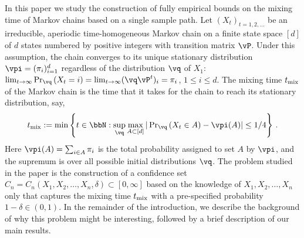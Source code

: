 

In this paper we study the construction of fully empirical bounds on the mixing time of Markov chains based on a single sample path.
Let $(X_t)_{t=1,2,\dotsc}$ be an irreducible, aperiodic time-homogeneous Markov chain on a finite state space $[d]$ of $d$ states numbered by positive integers with transition matrix $\vP$. Under this assumption, the chain converges to its unique stationary 
distribution $\vpi = (\pi_i)_{i=1}^d$ regardless of the distribution $\vq$ of $X_1$: 
$\lim_{t\to\infty} \Pr_{\vq}\Parens{X_t = i} = \lim_{t\to\infty} (\vq \vP^t)_i = \pi_i$, $1\le i \le d$.
The mixing time $t_{\operatorname{mix}}$ of the Markov chain is the time that it takes for the chain to reach its stationary distribution, say,
\[
  \tmix
  :=
  \min\Braces{
    t \in \bbN :
    \sup_{\vq}
    \max_{A\subset [d]} |\textstyle\Pr_{\vq}\Parens{ X_t \in A } - \vpi(A)|
    \leq 1/4
  }\,.
\]
Here $\vpi(A) = \sum_{i\in A} \pi_i$ is the total probability assigned
to set $A$ by $\vpi$, and the supremum is over
all possible initial distributions $\vq$.
The problem studied in the paper is the construction of a confidence
set $C_n = C_n(X_1,X_2,\dotsc,X_n,\delta) \subset [0,\infty]$ based on
the knowledge of $X_1,X_2,\dotsc,X_n$ only that captures the mixing
time $t_{\operatorname{mix}}$ with a pre-specified probability $1-\delta \in (0,1)$. 
In the remainder of the introduction, we describe the background of why this problem might be interesting, followed by a 
brief description of our main results.

